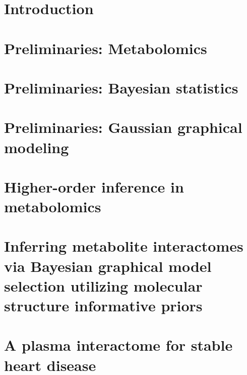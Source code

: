 \documentclass[final]{ulthesis}
\begin{document}
\tableofcontents \clearpage
\listoftables \clearpage
\listoffigures \clearpage

\mainmatter


\chapter{Introduction}


\chapter{Preliminaries: Metabolomics}


\chapter{Preliminaries: Bayesian statistics}


\chapter{Preliminaries: Gaussian graphical modeling}


\chapter{Higher-order inference in metabolomics}


\chapter{Inferring metabolite interactomes via Bayesian graphical model selection utilizing molecular structure informative priors}


\chapter{A plasma interactome for stable heart disease}

\end{document}
